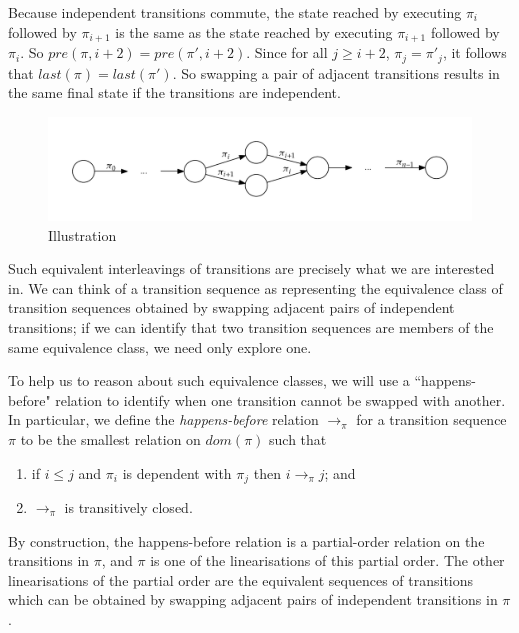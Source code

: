 \documentclass[12pt,a4paper,twoside,openright]{report}
\begin{document}
Because independent transitions commute, the state reached by
executing $\pi_i$ followed by $\pi_{i+1}$ is the same
as the state reached by executing $\pi_{i+1}$ followed
by $\pi_i$.
So $\textit{pre}(\pi, i+2) = \textit{pre}(\pi', i+2)$. Since 
for all $j \geq i + 2$, $\pi_j = \pi'_j$, it follows that
$\textit{last}(\pi) = \textit{last}(\pi')$. So swapping
a pair of adjacent transitions results in the same
final state if the transitions are independent.

\begin{figure}
	\centering
	\includegraphics[width=\textwidth]{seqequiv}
	\caption{Illustration}
	\label{fig:sequence-equivalence}
\end{figure}

Such equivalent interleavings
of transitions are precisely what we are interested in.
We can think of a transition sequence as representing
the equivalence class of transition sequences obtained
by swapping adjacent pairs of independent transitions;
if we can identify that two transition sequences are
members of the same equivalence class, we need only
explore one.

To help us to reason about such equivalence classes,
we will use a ``happens-before" relation to identify
when one transition cannot be swapped with another.
In particular, we define the \emph{happens-before}
relation $\longrightarrow_\pi$ for a transition
sequence $\pi$ to be the smallest relation on
$\textit{dom}(\pi)$ such that
\begin{enumerate}
	\item if $i \leq j$ and $\pi_i$ is dependent with
		$\pi_j$ then $i \longrightarrow_\pi j$; and
	\item $\longrightarrow_\pi$ is transitively closed.
\end{enumerate}

By construction, the happens-before relation is a
partial-order relation on the transitions in $\pi$,
and $\pi$ is one of the linearisations of this
partial order. The other linearisations of the
partial order are the equivalent sequences of
transitions which can be obtained by swapping
adjacent pairs of independent transitions in $\pi$.
\end{document}
